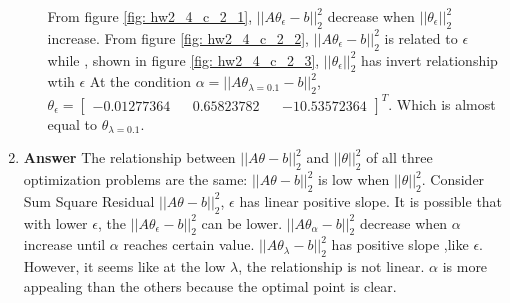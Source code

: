 \documentclass[11pt]{article}
\begin{document}
\begin{enumerate}[label=(\alph*)]
\begin{enumerate}[label=(\roman*)]
From figure \ref{fig: hw2_4_c_2_1}, $||A{\theta}_\epsilon -b||_2^2$ decrease when $||{\theta}_\epsilon ||_2^2$ increase. 
From figure \ref{fig: hw2_4_c_2_2},  $||A{\theta}_\epsilon -b||_2^2$ is related to $\epsilon$ 
while , shown in  figure \ref{fig: hw2_4_c_2_3},  $||{\theta}_\epsilon||_2^2$ has invert relationship wtih $\epsilon$ 
At the condition $\alpha = ||A{\theta}_{\lambda=0.1}-b ||_2^2$, ${\theta}_{\epsilon} = \begin{bmatrix}-0.01277364 && 0.65823782 && -10.53572364\end{bmatrix}^T$. 
Which is almost equal to  ${\theta}_{\lambda=0.1}$.

\end{enumerate}

\item \noindent\textbf{Answer} The relationship between $||A{\theta} -b||_2^2$ and  $||{\theta}||_2^2$ of all three optimization problems are the same:
 $||A{\theta} -b||_2^2$ is low when $||{\theta}||_2^2$. 
Consider Sum Square Residual $||A{\theta} -b||_2^2$, $\epsilon$ has linear positive slope. It is possible that with lower $\epsilon$, the $||A{\theta}_\epsilon -b||_2^2$ can be lower. 
$||A{\theta}_\alpha -b||_2^2$ decrease when $\alpha$ increase until $\alpha$ reaches certain value. 
$||A{\theta}_\lambda -b||_2^2$ has positive slope ,like $\epsilon$. However, it seems like at the low $\lambda$, the relationship is not linear. 
$\alpha$ is more appealing than the others because the optimal point is clear. 

\end{enumerate}
\end{document}
